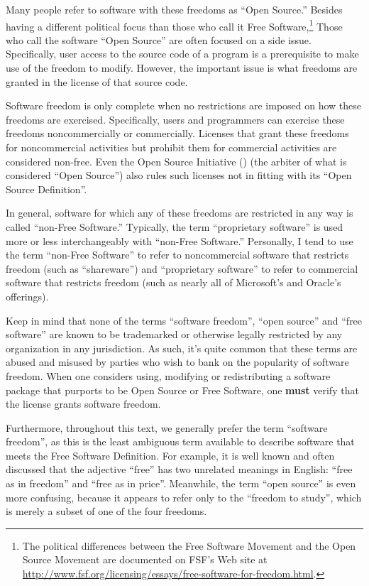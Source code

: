 Many people refer to software with these freedoms as ``Open Source.''
Besides having a different political focus than those who call it Free
Software,\footnote{The political differences between the Free Software
  Movement and the Open Source Movement are documented on FSF's Web site at
  \url{http://www.fsf.org/licensing/essays/free-software-for-freedom.html}.}
Those who call the software ``Open Source'' are often focused on a side
issue.  Specifically, user access to the source code of a program is a
prerequisite to make use of the freedom to modify.  However, the important
issue is what freedoms are granted in the license of that source code.

Software freedom is only complete when no restrictions are imposed on how
these freedoms are exercised.  Specifically, users and programmers can
exercise these freedoms noncommercially or commercially.  Licenses that grant
these freedoms for noncommercial activities but prohibit them for commercial
activities are considered non-free.  Even the Open Source Initiative
() (the arbiter of what is considered ``Open Source'') also rules
such licenses not in fitting with its ``Open Source Definition''.

In general, software for which any of these freedoms are
restricted in any way is called ``non-Free Software.''  Typically, the
term ``proprietary software'' is used more or less interchangeably with
``non-Free Software.''  Personally, I tend to use the term ``non-Free
Software'' to refer to noncommercial software that restricts freedom
(such as ``shareware'') and ``proprietary software'' to refer to
commercial software that restricts freedom (such as nearly all of
Microsoft's and Oracle's offerings).

Keep in mind that none of the terms ``software freedom'', ``open source''
and ``free software'' are known to be trademarked or otherwise legally
restricted by any organization in
any jurisdiction.  As such, it's quite common that these terms are abused and
misused by parties who wish to bank on the popularity of software freedom.
When one considers using, modifying or redistributing a software package that
purports to be Open Source or Free Software, one \textbf{must} verify that
the license grants software freedom.

Furthermore, throughout this text, we generally prefer the term ``software
freedom'', as this is the least ambiguous term available to describe software
that meets the Free Software Definition.  For example, it is well known and
often discussed that the adjective ``free'' has two unrelated meanings in
English: ``free as in freedom'' and ``free as in price''.  Meanwhile, the
term ``open source'' is even more confusing, because it appears to refer only to the
``freedom to study'', which is merely a subset of one of the four freedoms.

